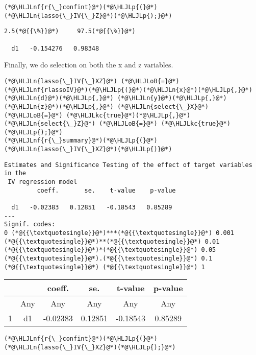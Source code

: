 \documentclass[12pt,a4paper]{article}
\newcommand{\HLJLkc}[1]{\textcolor[RGB]{59,151,46}{\textit{#1}}}
\newcommand{\HLJLn}[1]{#1}
\newcommand{\HLJLnf}[1]{\textcolor[RGB]{66,102,213}{#1}}
\newcommand{\HLJLoB}[1]{\textcolor[RGB]{102,102,102}{\textbf{#1}}}
\newcommand{\HLJLp}[1]{#1}
\begin{document}
\begin{lstlisting}
(*@\HLJLnf{r{\_}confint}@*)(*@\HLJLp{(}@*)(*@\HLJLn{lasso{\_}IV{\_}Z}@*)(*@\HLJLp{);}@*)
\end{lstlisting}

\begin{lstlisting}
2.5(*@{{\%}}@*)     97.5(*@{{\%}}@*)

  d1   -0.154276   0.98348
\end{lstlisting}


Finally, we do selection on both the x and z variables.


\begin{lstlisting}
(*@\HLJLn{lasso{\_}IV{\_}XZ}@*) (*@\HLJLoB{=}@*) (*@\HLJLnf{rlassoIV}@*)(*@\HLJLp{(}@*)(*@\HLJLn{x}@*)(*@\HLJLp{,}@*) (*@\HLJLn{d}@*)(*@\HLJLp{,}@*) (*@\HLJLn{y}@*)(*@\HLJLp{,}@*) (*@\HLJLn{z}@*)(*@\HLJLp{,}@*) (*@\HLJLn{select{\_}X}@*) (*@\HLJLoB{=}@*) (*@\HLJLkc{true}@*)(*@\HLJLp{,}@*) (*@\HLJLn{select{\_}Z}@*) (*@\HLJLoB{=}@*) (*@\HLJLkc{true}@*)(*@\HLJLp{);}@*)
(*@\HLJLnf{r{\_}summary}@*)(*@\HLJLp{(}@*)(*@\HLJLn{lasso{\_}IV{\_}XZ}@*)(*@\HLJLp{)}@*)
\end{lstlisting}

\begin{lstlisting}
Estimates and Significance Testing of the effect of target variables in the
 IV regression model
         coeff.       se.    t-value    p-value

  d1   -0.02383   0.12851   -0.18543   0.85289
---
Signif. codes:
0 (*@{{\textquotesingle}}@*)***(*@{{\textquotesingle}}@*) 0.001 (*@{{\textquotesingle}}@*)**(*@{{\textquotesingle}}@*) 0.01 (*@{{\textquotesingle}}@*)*(*@{{\textquotesingle}}@*) 0.05 (*@{{\textquotesingle}}@*).(*@{{\textquotesingle}}@*) 0.1 (*@{{\textquotesingle}}@*) (*@{{\textquotesingle}}@*) 1
\end{lstlisting}


\begin{tabular}{r|ccccc}
	&   & coeff. & se. & t-value & p-value\\
	\hline
	& Any & Any & Any & Any & Any\\
	\hline
	1 & d1 & -0.02383 & 0.12851 & -0.18543 & 0.85289 \\
\end{tabular}


\begin{lstlisting}
(*@\HLJLnf{r{\_}confint}@*)(*@\HLJLp{(}@*)(*@\HLJLn{lasso{\_}IV{\_}XZ}@*)(*@\HLJLp{);}@*)
\end{lstlisting}
\end{document}
